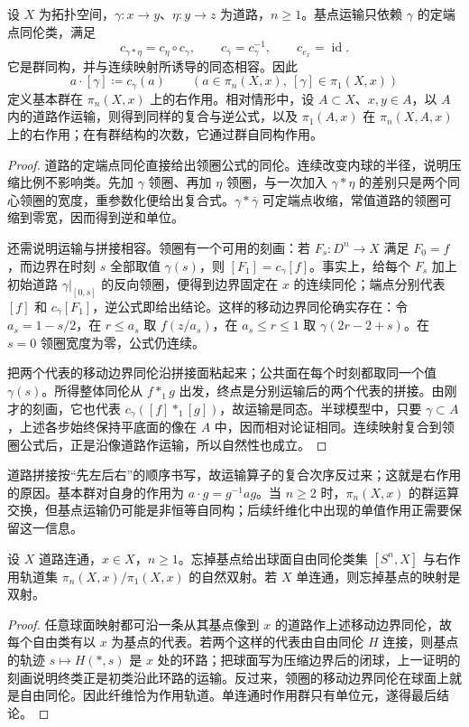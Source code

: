 \begin{proposition}\label{g2:prop:basepoint-action}
	设 \(X\) 为拓扑空间，\(\gamma:x\to y\)、\(\eta:y\to z\) 为道路，\(n\ge1\)。基点运输只依赖 \(\gamma\) 的定端点同伦类，满足
	\[
		c_{\gamma*\eta}=c_\eta\circ c_\gamma,
		\qquad c_{\bar\gamma}=c_\gamma^{-1},\qquad c_{e_x}=\operatorname{id}.
	\]
	它是群同构，并与连续映射所诱导的同态相容。因此
	\[
		a\cdot[\gamma]\coloneqq c_\gamma(a)
		\qquad(a\in\pi_n(X,x),\ [\gamma]\in\pi_1(X,x))
	\]
	定义基本群在 \(\pi_n(X,x)\) 上的右作用。相对情形中，设 \(A\subset X\)、\(x,y\in A\)，以 \(A\) 内的道路作运输，则得到同样的复合与逆公式，以及 \(\pi_1(A,x)\) 在 \(\pi_n(X,A,x)\) 上的右作用；在有群结构的次数，它通过群自同构作用。
\end{proposition}
\begin{proof}
	道路的定端点同伦直接给出领圈公式的同伦。连续改变内球的半径，说明压缩比例不影响类。先加 \(\gamma\) 领圈、再加 \(\eta\) 领圈，与一次加入 \(\gamma*\eta\) 的差别只是两个同心领圈的宽度，重参数化便给出复合式。\(\gamma*\bar\gamma\) 可定端点收缩，常值道路的领圈可缩到零宽，因而得到逆和单位。

	还需说明运输与拼接相容。领圈有一个可用的刻画：若 \(F_s:D^n\to X\) 满足 \(F_0=f\)，而边界在时刻 \(s\) 全部取值 \(\gamma(s)\)，则 \([F_1]=c_\gamma[f]\)。事实上，给每个 \(F_s\) 加上初始道路 \(\gamma|_{[0,s]}\) 的反向领圈，便得到边界固定在 \(x\) 的连续同伦；端点分别代表 \([f]\) 和 \(c_{\bar\gamma}[F_1]\)，逆公式即给出结论。这样的移动边界同伦确实存在：令 \(a_s=1-s/2\)，在 \(r\le a_s\) 取 \(f(z/a_s)\)，在 \(a_s\le r\le1\) 取 \(\gamma(2r-2+s)\)。在 \(s=0\) 领圈宽度为零，公式仍连续。

	把两个代表的移动边界同伦沿拼接面粘起来；公共面在每个时刻都取同一个值 \(\gamma(s)\)。所得整体同伦从 \(f*_1g\) 出发，终点是分别运输后的两个代表的拼接。由刚才的刻画，它也代表 \(c_\gamma([f]*_1[g])\)，故运输是同态。半球模型中，只要 \(\gamma\subset A\)，上述各步始终保持平底面的像在 \(A\) 中，因而相对论证相同。连续映射复合到领圈公式后，正是沿像道路作运输，所以自然性也成立。
\end{proof}

道路拼接按“先左后右”的顺序书写，故运输算子的复合次序反过来；这就是右作用的原因。基本群对自身的作用为 \(a\cdot g=g^{-1}ag\)。当 \(n\ge2\) 时，\(\pi_n(X,x)\) 的群运算交换，但基点运输仍可能是非恒等自同构；后续纤维化中出现的单值作用正需要保留这一信息。

\begin{corollary}\label{g2:cor:free-homotopy-orbits}
	设 \(X\) 道路连通，\(x\in X\)，\(n\ge1\)。忘掉基点给出球面自由同伦类集 \([S^n,X]\) 与右作用轨道集 \(\pi_n(X,x)/\pi_1(X,x)\) 的自然双射。若 \(X\) 单连通，则忘掉基点的映射是双射。
\end{corollary}
\begin{proof}
	任意球面映射都可沿一条从其基点像到 \(x\) 的道路作上述移动边界同伦，故每个自由类有以 \(x\) 为基点的代表。若两个这样的代表由自由同伦 \(H\) 连接，则基点的轨迹 \(s\mapsto H(*,s)\) 是 \(x\) 处的环路；把球面写为压缩边界后的闭球，上一证明的刻画说明终类正是初类沿此环路的运输。反过来，领圈的移动边界同伦在球面上就是自由同伦。因此纤维恰为作用轨道。单连通时作用群只有单位元，遂得最后结论。
\end{proof}

